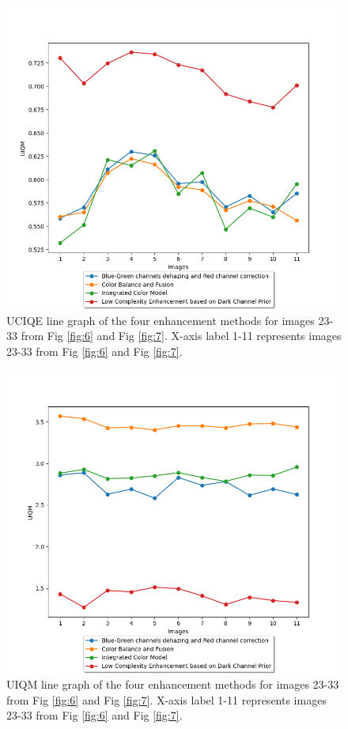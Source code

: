 \documentclass[a4paper,11pt,oneside]{article}
\begin{document}
  \begin{figure}[H]
  \begin{center}
  \includegraphics[width=\linewidth]{line_graph_UCIQE.png}
  \end{center}
  \caption{UCIQE line graph of the four enhancement methods for images 23-33 from Fig \ref{fig:6} and Fig \ref{fig:7}. X-axis label 1-11 represents images 23-33 from Fig \ref{fig:6} and Fig \ref{fig:7}.}
  \label{fig:12}
  \end{figure}
  \begin{figure}[H]
  \begin{center}
  \includegraphics[width=\linewidth]{line_graph_UIQM.png}
  \end{center}
  \caption{UIQM line graph of the four enhancement methods for images 23-33 from Fig \ref{fig:6} and Fig \ref{fig:7}. X-axis label 1-11 represents images 23-33 from Fig \ref{fig:6} and Fig \ref{fig:7}.}
  \label{fig:13}
  \end{figure}
  
\end{document}
